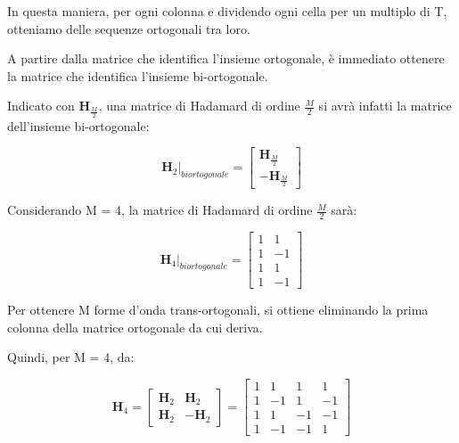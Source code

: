 In questa maniera, per ogni colonna e dividendo ogni cella per un multiplo di T, otteniamo delle sequenze ortogonali tra loro. \newline 

A partire dalla matrice che identifica l'insieme ortogonale, 
è immediato ottenere la matrice che identifica l'insieme bi-ortogonale. \newline 

Indicato con $\textbf{H}_{\frac{M}{2}}$, 
una matrice di Hadamard di ordine $\frac{M}{2}$ si avrà infatti la matrice dell'insieme bi-ortogonale: 

{
    \Large 
    \begin{equation}
        \left. \textbf{H}_{2} \right|_{biortogonale}
        = 
        \begin{bmatrix}
            \textbf{H}_{\frac{M}{2}} \\
            - \textbf{H}_{\frac{M}{2}}
        \end{bmatrix}
    \end{equation}
}

Considerando M = 4, 
la matrice di Hadamard di ordine $\frac{M}{2}$ sarà: 

{
    \Large 
    \begin{equation}
          \left. \textbf{H}_{4} \right|_{biortogonale}
        = 
        \begin{bmatrix}
            1 & 1  \\
            1 & -1 \\
            1 & 1  \\
            1 & -1 
        \end{bmatrix}
    \end{equation}
}


Per ottenere M forme d'onda trans-ortogonali, 
si ottiene eliminando la prima colonna della matrice ortogonale da cui deriva. \newline 

Quindi, per M = 4, da: 

{
    \Large 
    \begin{equation}
          \textbf{H}_{4}
        = 
        \begin{bmatrix}
            \textbf{H}_{2} & \textbf{H}_{2} \\
            \textbf{H}_{2} & - \textbf{H}_{2}
        \end{bmatrix}
        =
        \begin{bmatrix}
            1 & 1 & 1 & 1 \\
            1 & -1 & 1 & -1 \\
            1 & 1 & -1 & -1 \\
            1 & -1 & -1 & 1 
        \end{bmatrix}
    \end{equation}
}

